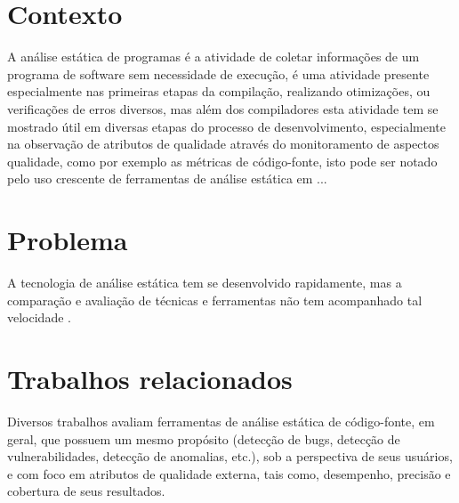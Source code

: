 
\section{Contexto}
A análise estática de programas é a atividade de coletar informações de um
programa de software sem necessidade de execução, é uma atividade presente
especialmente nas primeiras etapas da compilação, realizando otimizações, ou
verificações de erros diversos, mas além dos compiladores esta atividade tem
se mostrado útil em diversas etapas do processo de desenvolvimento,
especialmente na observação de atributos de qualidade através do monitoramento
de aspectos qualidade, como por exemplo as métricas de código-fonte, isto pode
ser notado pelo uso crescente de ferramentas de análise estática em ...

\section{Problema}

A tecnologia de análise estática tem se desenvolvido rapidamente, mas a
comparação e avaliação de técnicas e ferramentas não tem acompanhado tal
velocidade \cite{Li2010}.

\section{Trabalhos relacionados}

Diversos trabalhos avaliam ferramentas de análise estática de código-fonte,
em geral, que possuem um mesmo propósito (detecção de bugs, 
detecção de vulnerabilidades, detecção de anomalias, etc.),
sob a perspectiva de seus usuários, 
e com foco em atributos de qualidade externa, tais como, desempenho, 
precisão e cobertura de seus resultados. 

